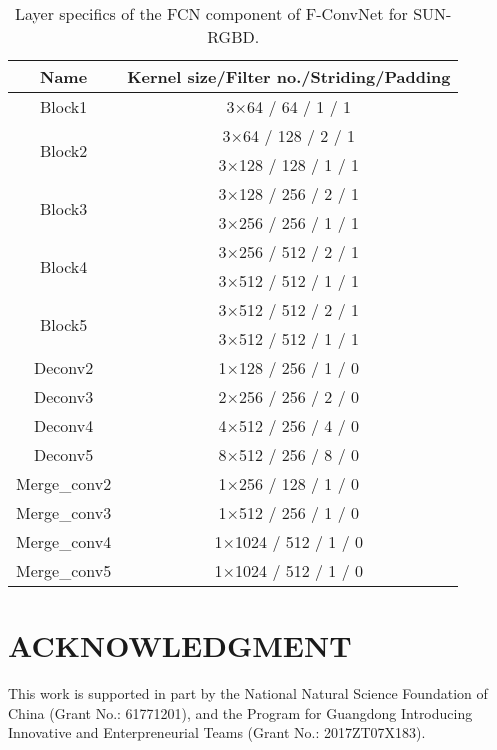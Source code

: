 \documentclass[letterpaper, 10 pt, conference]{ieeeconf}
\begin{document}
\begin{table}[h]
	\begin{center}
	\begin{tabular}{c|c}
		\hline
		Name                    & Kernel size/Filter no./Striding/Padding \\ \hline
		Block1                  & 3$\times$64 / 64  / 1 / 1               \\
		\hline
		\multirow{2}{*}{Block2} & 3$\times$64 / 128  / 2 / 1              \\
		                        & 3$\times$128 / 128 / 1 / 1              \\
		\hline
		\multirow{2}{*}{Block3} & 3$\times$128 / 256 / 2 / 1              \\
		                        & 3$\times$256 / 256 / 1 / 1              \\
		\hline
		\multirow{2}{*}{Block4} & 3$\times$256 / 512 / 2 / 1              \\
		                        & 3$\times$512 / 512 / 1 / 1              \\
		\hline
		\multirow{2}{*}{Block5} & 3$\times$512 / 512 / 2 / 1              \\
		                        & 3$\times$512 / 512 / 1 / 1              \\
		\hline
		Deconv2                 & 1$\times$128 / 256 / 1 / 0              \\
		Deconv3                 & 2$\times$256 / 256 / 2 / 0              \\
		Deconv4                 & 4$\times$512 / 256 / 4 / 0              \\
		Deconv5                 & 8$\times$512 / 256 / 8 / 0              \\
		\hline
		Merge\_conv2            & 1$\times$256 / 128 / 1 / 0              \\
		Merge\_conv3            & 1$\times$512 / 256 / 1 / 0              \\
		Merge\_conv4            & 1$\times$1024 / 512 / 1 / 0             \\
		Merge\_conv5            & 1$\times$1024 / 512 / 1 / 0             \\
		\hline
	\end{tabular}
	\caption{Layer specifics of the FCN component of F-ConvNet for SUN-RGBD. }
	\label{Tab:SUNRGBD_SPECIFICS}
	\end{center}
	\vspace{-0.5cm}
\end{table}




\section*{ACKNOWLEDGMENT}
This work is supported in part by the National Natural Science Foundation of China (Grant No.: 61771201), and the Program for Guangdong Introducing Innovative and Enterpreneurial Teams (Grant No.: 2017ZT07X183).



\end{document}

